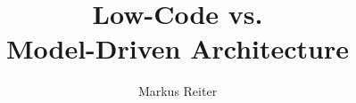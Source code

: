 \usepackage{lmodern}
\usepackage[english]{babel}
\usepackage{csquotes}

\usepackage{fontspec}

\usepackage{multicol}

\usepackage{listings}

\usepackage{datetime}
\setdefaultdate{\usdate}

\usepackage{graphicx}
\graphicspath{{assets/}}

\newcommand{\german}[1]{{#1}}

\title{Low-Code vs.\texorpdfstring{\\}{} Model-Driven Architecture}
\author{Markus Reiter}
